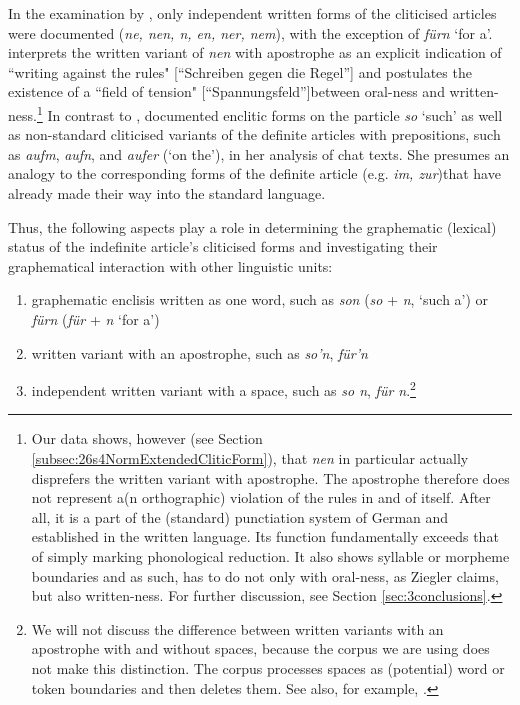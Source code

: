 In the examination by \citet[173]{Tophinke2002}, only independent written forms of the cliticised articles were documented (\textit{ne, nen, n, en, ner, nem}), with the exception of \textit{fürn} `for a'.
\citet[312]{Ziegler2011} interprets the written variant of \textit{nen} with apostrophe as an explicit indication of ``writing against the rules" [``Schreiben gegen die Regel''] and postulates the existence of a ``field of tension" [``Spannungsfeld'']between oral-ness and written-ness.\footnote{
	Our data shows, however (see Section \ref{subsec:26s4NormExtendedCliticForm}), that \textit{nen} in particular actually disprefers the written variant with apostrophe.
	The apostrophe therefore does not represent a(n orthographic) violation of the rules in and of itself.
	After all, it is a part of the (standard) punctiation system of German and established in the written language.
	Its function fundamentally exceeds that of simply marking phonological reduction.
	It also shows syllable or morpheme boundaries and as such, has to do not only with oral-ness, as Ziegler claims, but also written-ness.
	For further discussion, see Section \ref{sec:3conclusions}.}
In contrast to \citet{Prinz1991}, \citet[7]{Burri2003} documented enclitic forms on the particle \textit{so} `such' as well as non-standard cliticised variants of the definite articles with prepositions, such as \textit{aufm}, \textit{aufn}, and \textit{aufer} (`on the'), in her analysis of chat texts.
She presumes an analogy to the corresponding forms of the definite article (e.g. \textit{im, zur})that have already made their way into the standard language.

Thus, the following aspects play a role in determining the graphematic (lexical) status of the indefinite article's cliticised forms and investigating their graphematical interaction with other linguistic units:
\begin{enumerate}
	\item graphematic enclisis written as one word, such as \textit{son} (\textit{so} + \textit{n}, `such a') or \textit{fürn} (\textit{für} + \textit{n} `for a')
	\item written variant with an apostrophe, such as \textit{so'n}, \textit{für'n}
	\item independent written variant with a space, such as \textit{so n}, \textit{für n}.\footnote{
		We will not discuss the difference between written variants with an apostrophe with and without spaces, because the corpus we are using does not make this distinction. 
		The corpus processes spaces as (potential) word or token boundaries and then deletes them.
		See also, for example, \citet[Ch. 4]{SchaeferBildhauer2013}.}
\end{enumerate}

